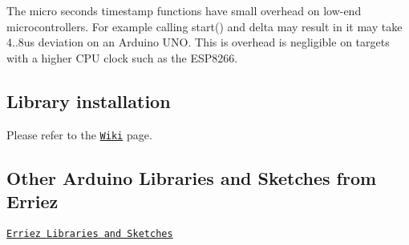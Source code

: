The micro seconds timestamp functions have small overhead on low-\/end microcontrollers. For example calling {\ttfamily start()} and {\ttfamily delta} may result in it may take 4..8us deviation on an Arduino U\+NO. This is overhead is negligible on targets with a higher C\+PU clock such as the E\+S\+P8266.

\subsection*{Library installation}

Please refer to the \href{https://github.com/Erriez/ErriezArduinoLibrariesAndSketches/wiki}{\tt Wiki} page.

\subsection*{Other Arduino Libraries and Sketches from Erriez}


\begin{DoxyItemize}
\item \href{https://github.com/Erriez/ErriezArduinoLibrariesAndSketches}{\tt Erriez Libraries and Sketches} 
\end{DoxyItemize}
